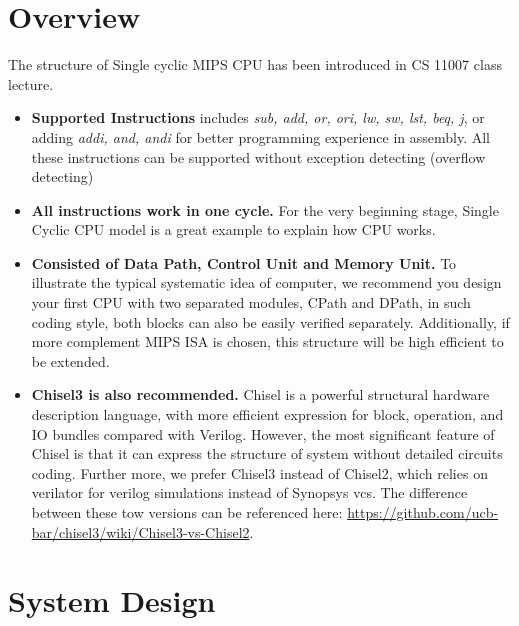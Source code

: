 \documentclass[a4paper]{article}
\begin{document}


\section{Overview} \label{overview}%
The structure of Single cyclic MIPS CPU has been introduced in CS 11007 class lecture.
\begin{itemize}
	\item{\textbf{Supported Instructions} includes \emph{sub, add, or, ori, lw, sw, lst, beq, j}, or adding \emph{addi, and, andi} for better programming experience in assembly. All these instructions can be supported without exception detecting (overflow detecting)}
    \item{\textbf{All instructions work in one cycle.} For the very beginning stage, Single Cyclic CPU model is a great example to explain how CPU works.}
    \item{\textbf{Consisted of Data Path, Control Unit and Memory Unit.} To illustrate the typical systematic idea of computer, we recommend you design your first CPU with two separated modules, CPath and DPath, in such coding style, both blocks can also be easily verified separately. Additionally, if more complement MIPS ISA is chosen, this structure will be high efficient to be extended.}
    \item{\textbf{Chisel3 is also recommended.} Chisel is a powerful structural hardware description language, with more efficient expression for block, operation, and IO bundles compared with Verilog. However, the most significant feature of Chisel is that it can express the structure of system without detailed circuits coding. Further more, we prefer Chisel3 instead of Chisel2, which relies on verilator for verilog simulations instead of Synopsys vcs. The difference between these tow versions can be referenced here: \url{https://github.com/ucb-bar/chisel3/wiki/Chisel3-vs-Chisel2}.}
\end{itemize}


\newpage
\section{System Design} \label{sysdes}%
\end{document}
